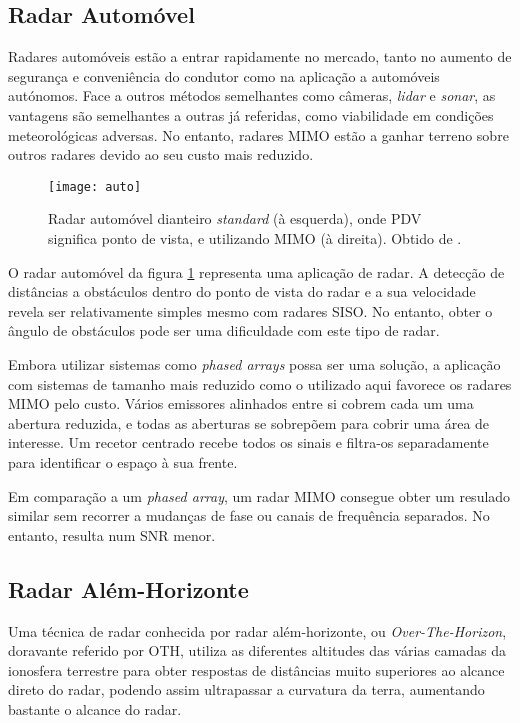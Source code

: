 \documentclass[purist,portuguese]{ist-report}
\begin{document}
\subsection{Radar Automóvel}

Radares automóveis estão a entrar rapidamente no mercado, tanto no aumento de segurança e conveniência do condutor como na aplicação a automóveis autónomos. Face a outros métodos semelhantes como câmeras, \textit{lidar} e \textit{sonar}, as vantagens são semelhantes a outras já referidas, como viabilidade em condições meteorológicas adversas. No entanto, radares MIMO estão a ganhar terreno sobre outros radares devido ao seu custo mais reduzido.

\begin{figure}[ht]
	\centering
	\texttt{[image: auto]}
	\caption{Radar automóvel dianteiro \textit{standard} (à esquerda), onde PDV significa ponto de vista, e utilizando MIMO (à direita). Obtido de \textit{\citeauthor{mimoradarbook}} \cite{mimoradarbook}.}
	\label{fig:autorad}
\end{figure}

O radar automóvel da figura \ref{fig:autorad} representa uma aplicação de radar. A detecção de distâncias a obstáculos dentro do ponto de vista do radar e a sua velocidade revela ser relativamente simples mesmo com radares SISO. No entanto, obter o ângulo de obstáculos pode ser uma dificuldade com este tipo de radar.

Embora utilizar sistemas como \textit{phased arrays} possa ser uma solução, a aplicação com sistemas de tamanho mais reduzido como o utilizado aqui favorece os radares MIMO pelo custo. Vários emissores alinhados entre si cobrem cada um uma abertura reduzida, e todas as aberturas se sobrepõem para cobrir uma área de interesse. Um recetor centrado recebe todos os sinais e filtra-os separadamente para identificar o espaço à sua frente.

Em comparação a um \textit{phased array}, um radar MIMO consegue obter um resulado similar sem recorrer a mudanças de fase ou canais de frequência separados. No entanto, resulta num SNR menor.

\subsection{Radar Além-Horizonte}

Uma técnica de radar conhecida por radar além-horizonte, ou \textit{Over-The-Horizon}, doravante referido por OTH, utiliza as diferentes altitudes das várias camadas da ionosfera terrestre para obter respostas de distâncias muito superiores ao alcance direto do radar, podendo assim ultrapassar a curvatura da terra, aumentando bastante o alcance do radar.
\end{document}
